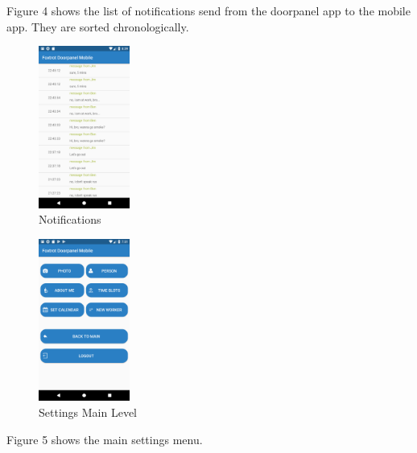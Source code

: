 \documentclass[article,colorback,accentcolor=tud4c, 11pt]{tudreport}
\begin{document}
Figure 4 shows the list of notifications send from the doorpanel app to the mobile app. They are sorted chronologically. \\
 
	\begin{figure}
		\centering
		\includegraphics[width=30mm,scale=0.8]{mobile/Notifications.png}
		\caption{Notifications}
	\end{figure}

	\begin{figure}
		\centering
		\includegraphics[width=30mm,scale=0.8]{mobile/Settings.png}
		\caption{Settings Main Level}
	\end{figure}	

Figure 5 shows the main settings menu. 

	
	
	
	\listoffigures{}
\end{document}
